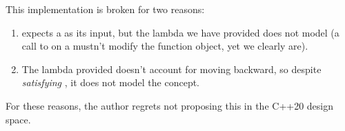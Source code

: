 This implementation is broken for two reasons:

\begin{enumerate}
  \item {} expects a  as its input, but the lambda we have
        provided does not model  (a call to  on a 
        mustn't modify the function object, yet we clearly are).
  \item The lambda provided doesn't account for moving backward, so despite \textit{satisfying}
        , it does not model the concept.
\end{enumerate}

For these reasons, the author regrets not proposing this in the C++20 design space.
